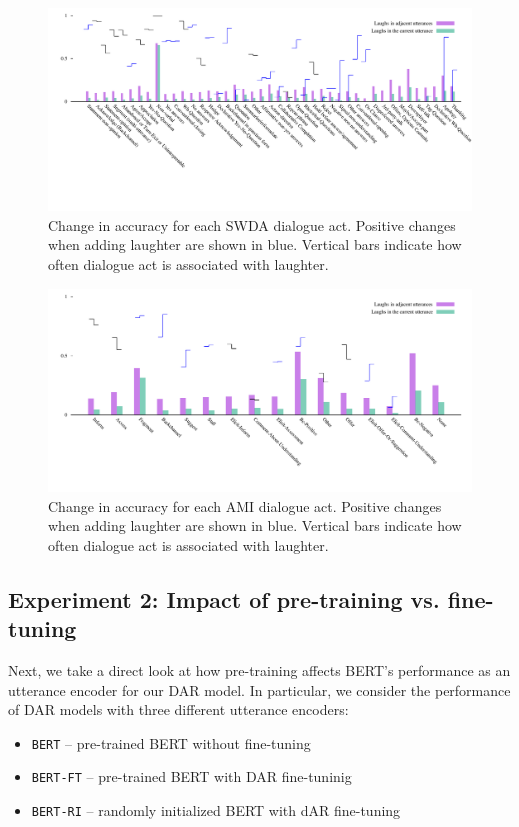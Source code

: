 \documentclass[11pt,a4paper]{article}
\begin{document}
\begin{figure}
  \centering
  \includegraphics[width=\textwidth]{img/SWDA-bertLvsNL.pdf}
  \caption{Change in accuracy for each SWDA dialogue act. Positive changes when adding laughter are shown in blue. Vertical bars indicate how often dialogue act is associated with laughter.}
    \label{fig:swda-by-da}
\end{figure}

\begin{figure}
  \label{fig:ami-by-da}
  \centering
  \includegraphics[width=\textwidth]{img/AMI-DA-bertLvsNL.pdf}
  \caption{Change in accuracy for each AMI dialogue act. Positive changes when adding laughter are shown in blue. Vertical bars indicate how often dialogue act is associated with laughter.}
\end{figure}

\subsection{Experiment 2: Impact of pre-training vs. fine-tuning} \label{sec:experiment2} %
Next, we take a direct look at how pre-training affects BERT's performance as an utterance encoder for our DAR model.
In particular, we consider the performance of DAR models with three different utterance encoders:
\begin{itemize}
  \item \texttt{BERT} -- pre-trained BERT without fine-tuning 
  \item \texttt{BERT-FT} -- pre-trained BERT with DAR fine-tuninig 
  \item \texttt{BERT-RI} -- randomly initialized BERT with dAR fine-tuning 
\end{itemize}
\end{document}
